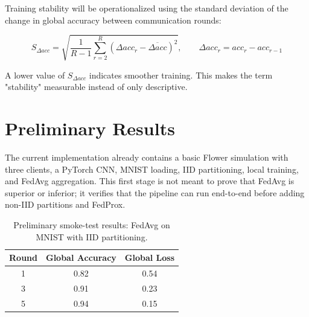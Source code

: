 \documentclass[11pt,a4paper]{article}
\begin{document}
Training stability will be operationalized using the standard deviation of the change in global accuracy between communication rounds:

\[
S_{\Delta acc} =
\sqrt{
\frac{1}{R-1}\sum_{r=2}^{R}
\left(\Delta acc_r - \overline{\Delta acc}\right)^2
},
\qquad
\Delta acc_r = acc_r - acc_{r-1}
\]

A lower value of $S_{\Delta acc}$ indicates smoother training. This makes the term "stability" measurable instead of only descriptive.

\section{Preliminary Results}

The current implementation already contains a basic Flower simulation with three clients, a PyTorch CNN, MNIST loading, IID partitioning, local training, and FedAvg aggregation. This first stage is not meant to prove that FedAvg is superior or inferior; it verifies that the pipeline can run end-to-end before adding non-IID partitions and FedProx.

\begin{table}[H]
\centering
\caption{Preliminary smoke-test results: FedAvg on MNIST with IID partitioning.}
\begin{tabular}{ccc}
\toprule
\textbf{Round} & \textbf{Global Accuracy} & \textbf{Global Loss} \\
\midrule
1 & 0.82 & 0.54 \\
3 & 0.91 & 0.23 \\
5 & 0.94 & 0.15 \\
\bottomrule
\end{tabular}
\end{table}
\end{document}

